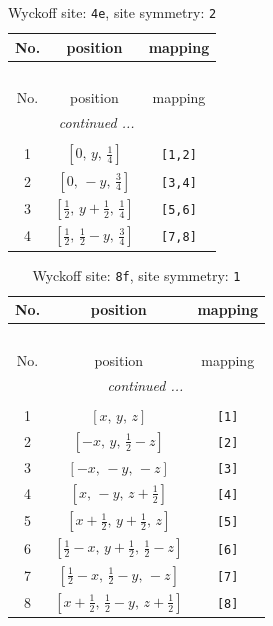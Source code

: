 \documentclass[fleqn,8pt]{jsarticle}
\begin{document}
\renewcommand{\arraystretch}{1.2}
\begin{longtable}{ccc}
\caption{Wyckoff site: {\tt 4e}, site symmetry: {\tt 2}}
 \\
 \hline \hline
No. & position & mapping \\ \hline \endfirsthead

\multicolumn{2}{l}{\tablename\ \thetable{}} \\
 \hline \hline
No. & position & mapping \\ \hline \endhead

 \hline \hline
\multicolumn{2}{r}{\footnotesize\it continued ...} \\ \endfoot

 \hline \hline
\multicolumn{2}{r}{} \\ \endlastfoot

1 & $\left[ 0,\, y,\, \frac{1}{4} \right]$ & {\tt [1,2]} \\ \hline
2 & $\left[ 0,\, - y,\, \frac{3}{4} \right]$ & {\tt [3,4]} \\ \hline
3 & $\left[ \frac{1}{2},\, y + \frac{1}{2},\, \frac{1}{4} \right]$ & {\tt [5,6]} \\ \hline
4 & $\left[ \frac{1}{2},\, \frac{1}{2} - y,\, \frac{3}{4} \right]$ & {\tt [7,8]} \\
\end{longtable}
\renewcommand{\arraystretch}{1.2}
\begin{longtable}{ccc}
\caption{Wyckoff site: {\tt 8f}, site symmetry: {\tt 1}}
 \\
 \hline \hline
No. & position & mapping \\ \hline \endfirsthead

\multicolumn{2}{l}{\tablename\ \thetable{}} \\
 \hline \hline
No. & position & mapping \\ \hline \endhead

 \hline \hline
\multicolumn{2}{r}{\footnotesize\it continued ...} \\ \endfoot

 \hline \hline
\multicolumn{2}{r}{} \\ \endlastfoot

1 & $\left[ x,\, y,\, z \right]$ & {\tt [1]} \\ \hline
2 & $\left[ - x,\, y,\, \frac{1}{2} - z \right]$ & {\tt [2]} \\ \hline
3 & $\left[ - x,\, - y,\, - z \right]$ & {\tt [3]} \\ \hline
4 & $\left[ x,\, - y,\, z + \frac{1}{2} \right]$ & {\tt [4]} \\ \hline
5 & $\left[ x + \frac{1}{2},\, y + \frac{1}{2},\, z \right]$ & {\tt [5]} \\ \hline
6 & $\left[ \frac{1}{2} - x,\, y + \frac{1}{2},\, \frac{1}{2} - z \right]$ & {\tt [6]} \\ \hline
7 & $\left[ \frac{1}{2} - x,\, \frac{1}{2} - y,\, - z \right]$ & {\tt [7]} \\ \hline
8 & $\left[ x + \frac{1}{2},\, \frac{1}{2} - y,\, z + \frac{1}{2} \right]$ & {\tt [8]} \\
\end{longtable}
\end{document}
